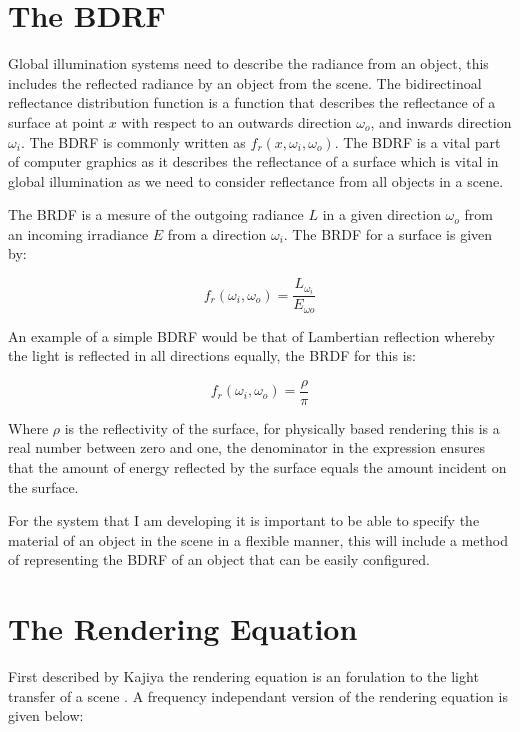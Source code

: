 \section{The BDRF}
\label{sec:bdrf}
Global illumination systems need to describe the radiance from an object, this includes the
reflected radiance by an object from the scene.
The bidirectinoal reflectance distribution function \cite{Nicodemus65}is a function that describes 
the reflectance of a surface at point $x$ with respect to an outwards direction $\omega_{o}$, and 
inwards direction $\omega_{i}$. The BDRF is commonly written as $f_{r}(x, \omega_{i},\omega_{o})$. 
The BDRF is a vital part of computer graphics as it describes the reflectance of a surface which is 
vital in global illumination as we need to consider reflectance from all objects in a scene.

The BRDF is a mesure of the outgoing radiance $L$ in a given direction $\omega_{o}$ from an incoming
irradiance $E$ from a direction $\omega_{i}$. The BRDF for a surface is given by:

\begin{equation}
f_{r}(\omega_{i}, \omega_{o}) = \frac{L_{\omega_{i}}}{E_{\omega{o}}}
\end{equation}

An example of a simple BDRF would be that of Lambertian reflection whereby the light is reflected
in all directions equally, the BRDF for this is:

\begin{equation}
f_{r}(\omega_{i}, \omega_{o}) = \frac{\rho}{\pi}
\end{equation}

Where $\rho$ is the reflectivity of the surface, for physically based rendering this is a real
number between zero and one, the denominator in the expression ensures that the amount of
energy reflected by the surface equals the amount incident on the surface.

For the system that I am developing it is important to be able to specify the material of an
object in the scene in a flexible manner, this will include a method of representing the BDRF of
an object that can be easily configured.

\section{The Rendering Equation}
\label{sec:rendering_eq}
First described by Kajiya the rendering equation is an
forulation to the light transfer of a scene \cite{Kajiya86}. A frequency independant version of
the rendering equation is given below:

